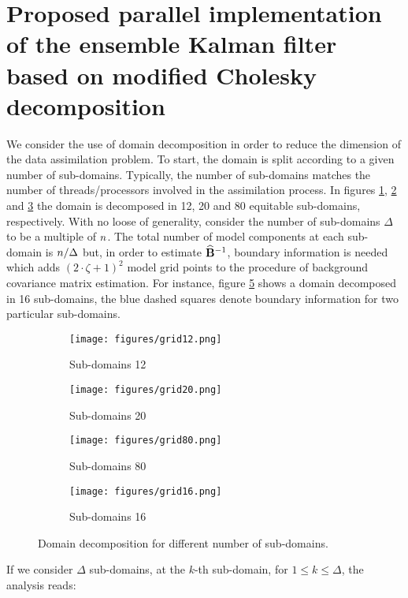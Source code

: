 \documentclass[12pt]{article}
\newcommand{\ra}{\zeta}
\newcommand{\BEST}{\widehat{\bf B}}
\begin{document}
\section{Proposed parallel implementation of the ensemble Kalman filter based on modified Cholesky decomposition}
\label{sec:parallel-implementation}

We consider the use of domain decomposition in order to reduce the dimension of the data assimilation problem. To start, the domain is split according to a given number of sub-domains. Typically, the number of sub-domains matches the number of threads/processors involved in the assimilation process. In figures \ref{fig:SD12}, \ref{fig:SD20} and \ref{fig:SD80} the domain is decomposed in 12, 20 and 80 equitable sub-domains, respectively. With no loose of generality, consider the number of sub-domains $\Delta$ to be a multiple of $n$. The total number of model components at each sub-domain is $n / \Delta$ but, in order to estimate $\BEST^{-1}$, boundary information is needed which adds $(2 \cdot \ra+1)^2$ model grid points to the procedure of background covariance matrix estimation. For instance, figure \ref{fig:SD16-boundaries} shows a domain decomposed in 16 sub-domains, the blue dashed squares denote boundary information for two particular sub-domains. 
\begin{figure}[htp]
\centering
\begin{subfigure}{0.45\textwidth}
\centering
\texttt{[image: figures/grid12.png]}
\caption{Sub-domains 12}
\label{fig:SD12}
\end{subfigure}\begin{subfigure}{0.45\textwidth}
\centering
\texttt{[image: figures/grid20.png]}
\caption{Sub-domains 20}
\label{fig:SD20}
\end{subfigure}

\begin{subfigure}{0.45\textwidth}
\centering
\texttt{[image: figures/grid80.png]}
\caption{Sub-domains 80}
\label{fig:SD80}
\end{subfigure}\begin{subfigure}{0.45\textwidth}
\centering
\texttt{[image: figures/grid16.png]}
\caption{Sub-domains 16}
\label{fig:SD16-boundaries}
\end{subfigure}
\caption{Domain decomposition for different number of sub-domains. }
\end{figure}
If we consider $\Delta$ sub-domains, at the $k$-th sub-domain, for $1 \le k \le \Delta$, the analysis reads:
\end{document}
